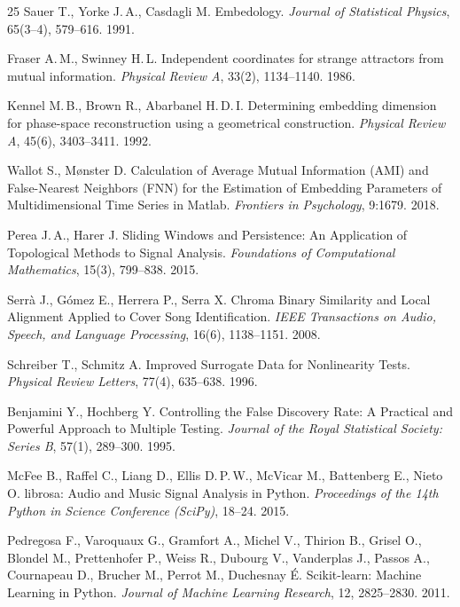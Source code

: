 \begin{thebibliography}{25}
Sauer T., Yorke J.\,A., Casdagli M.
Embedology.
\textit{Journal of Statistical Physics}, 65(3--4), 579--616. 1991.

Fraser A.\,M., Swinney H.\,L.
Independent coordinates for strange attractors from mutual information.
\textit{Physical Review A}, 33(2), 1134--1140. 1986.

Kennel M.\,B., Brown R., Abarbanel H.\,D.\,I.
Determining embedding dimension for phase-space reconstruction using a geometrical construction.
\textit{Physical Review A}, 45(6), 3403--3411. 1992.

Wallot S., M{\o}nster D.
Calculation of Average Mutual Information (AMI) and False-Nearest Neighbors (FNN) for the Estimation of Embedding Parameters of Multidimensional Time Series in Matlab.
\textit{Frontiers in Psychology}, 9:1679. 2018.

Perea J.\,A., Harer J.
Sliding Windows and Persistence: An Application of Topological Methods to Signal Analysis.
\textit{Foundations of Computational Mathematics}, 15(3), 799--838. 2015.

Serr\`{a} J., G\'{o}mez E., Herrera P., Serra X.
Chroma Binary Similarity and Local Alignment Applied to Cover Song Identification.
\textit{IEEE Transactions on Audio, Speech, and Language Processing}, 16(6), 1138--1151. 2008.

Schreiber T., Schmitz A.
Improved Surrogate Data for Nonlinearity Tests.
\textit{Physical Review Letters}, 77(4), 635--638. 1996.

Benjamini Y., Hochberg Y.
Controlling the False Discovery Rate: A Practical and Powerful Approach to Multiple Testing.
\textit{Journal of the Royal Statistical Society: Series B}, 57(1), 289--300. 1995.

McFee B., Raffel C., Liang D., Ellis D.\,P.\,W., McVicar M., Battenberg E., Nieto O.
librosa: Audio and Music Signal Analysis in Python.
\textit{Proceedings of the 14th Python in Science Conference (SciPy)}, 18--24. 2015.

Pedregosa F., Varoquaux G., Gramfort A., Michel V., Thirion B., Grisel O., Blondel M., Prettenhofer P., Weiss R., Dubourg V., Vanderplas J., Passos A., Cournapeau D., Brucher M., Perrot M., Duchesnay \'{E}.
Scikit-learn: Machine Learning in Python.
\textit{Journal of Machine Learning Research}, 12, 2825--2830. 2011.


\end{thebibliography}
